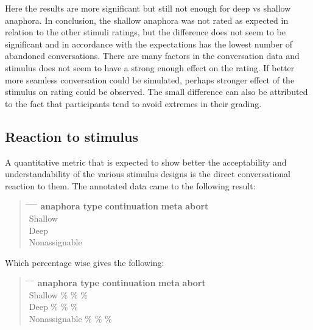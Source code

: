 Here the results are more significant but still not enough for deep vs shallow anaphora.
In conclusion, the shallow anaphora was not rated as expected in relation to the other stimuli ratings, but
the difference does not seem to be significant and
in accordance with the expectations has the lowest number of abandoned conversations.
There are many factors in the conversation data and
stimulus does not seem to have a strong enough effect on the rating.
If better more seamless conversation could be simulated,
perhaps stronger effect of the stimulus on rating could be observed.
The small difference can also be attributed to the fact that participants tend to
avoid extremes in their grading.

\subsection{Reaction to stimulus}

A quantitative metric that is expected to show better the acceptability and understandability
of the various stimulus designs is the direct conversational reaction to them.
The annotated data came to the following result:

\begin{quote}
\begin{tabbing}
\hspace{4cm} \= \hspace{3cm} \= \hspace{3cm} \= \hspace{3cm} \= \kill %
\textbf{anaphora type} \> \textbf{continuation} \> \textbf{meta} \> \textbf{abort} \\
Shallow            \\
Deep               \\
Nonassignable      \\
\end{tabbing}
\end{quote}

Which percentage wise gives the following:

\begin{quote}
\begin{tabbing}
\hspace{4cm} \= \hspace{3cm} \= \hspace{3cm} \= \= \hspace{3cm} \kill %
\textbf{anaphora type} \> \textbf{continuation} \> \textbf{meta} \> \textbf{abort} \\
Shallow         \% \% \% \\
Deep            \% \% \% \\
Nonassignable   \% \% \% \\
\end{tabbing}
\end{quote}

